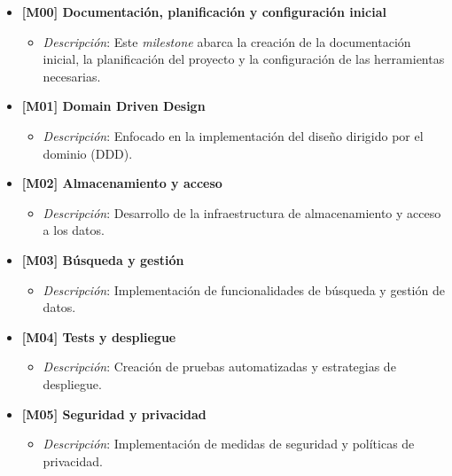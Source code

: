\begin{itemize}
    \item \textbf{[M00] \- Documentación, planificación y configuración inicial}
    \begin{itemize}
        \item \textit{Descripción}: Este \textit{milestone} abarca la creación de la documentación inicial, la planificación del proyecto y la configuración de las herramientas necesarias.
    \end{itemize}

    \item \textbf{[M01] \- Domain Driven Design}
    \begin{itemize}
        \item \textit{Descripción}: Enfocado en la implementación del diseño dirigido por el dominio (DDD).
    \end{itemize}

    \item \textbf{[M02] \- Almacenamiento y acceso}
    \begin{itemize}
        \item \textit{Descripción}: Desarrollo de la infraestructura de almacenamiento y acceso a los datos.
    \end{itemize}

    \item \textbf{[M03] \- Búsqueda y gestión}
    \begin{itemize}
        \item \textit{Descripción}: Implementación de funcionalidades de búsqueda y gestión de datos.
    \end{itemize}

    \item \textbf{[M04] \- Tests y despliegue}
    \begin{itemize}
        \item \textit{Descripción}: Creación de pruebas automatizadas y estrategias de despliegue.
    \end{itemize}

    \item \textbf{[M05] \- Seguridad y privacidad}
    \begin{itemize}
        \item \textit{Descripción}: Implementación de medidas de seguridad y políticas de privacidad.
    \end{itemize}
\end{itemize}